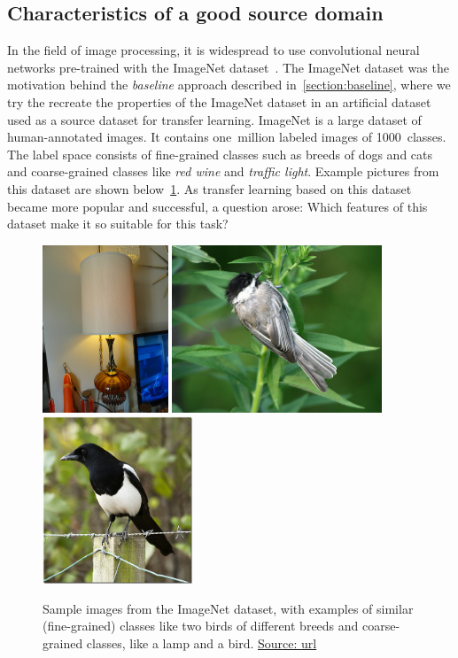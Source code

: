 \documentclass[a4paper,11pt,twoside]{report}
\theoremstyle{definition}
\begin{document}
\subsection{Characteristics of a good source domain}

In the field of image processing, it is widespread to use convolutional neural networks \mbox{pre-trained} with the ImageNet dataset~\cite{imagnet}. The ImageNet dataset was the motivation behind the \textit{baseline} approach described in~\ref{section:baseline}, where we try the recreate the properties of the ImageNet dataset in an artificial dataset used as a source dataset for transfer learning. ImageNet is a large dataset of human-annotated images. It contains one~million labeled images of 1000~classes. The label space consists of fine-grained classes such as breeds of dogs and cats and coarse-grained classes like \textit{red wine} and \textit{traffic light}. Example pictures from this dataset are shown below~\ref{fig:image_net}. As transfer learning based on this dataset became more popular and successful, a question arose: Which features of this dataset make it so suitable for this task?
\FloatBarrier

\begin{figure}[h!]
\centering
\includegraphics[height=5cm]{imgs/lamp.jpeg}
\includegraphics[height=5cm]{imgs/bird1.jpeg}
\includegraphics[height=5cm]{imgs/bird2.jpeg}
\caption{Sample images from the ImageNet dataset, with examples of similar (fine-grained) classes like two birds of different breeds and coarse-grained classes, like a lamp and a bird. \href{https://www.kaggle.com/competitions/imagenet-object-localization-challenge/data}{Source: url}}
\label{fig:image_net}
\end{figure}
\end{document}
